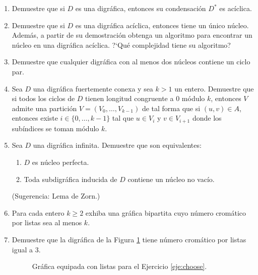 \documentclass{article}
\begin{document}
\begin{enumerate}
  \item Demuestre que si $D$ es una digr\'afica, entonces su
    condensaci\'on $D^\ast$ es ac\'iclica.

  \item Demuestre que si $D$ es una digr\'afica ac\'iclica, entonces
    tiene un \'unico n\'ucleo.   Adem\'as, a partir de su demostraci\'on
    obtenga un algoritmo para encontrar un n\'ucleo en una digr\'afica
    ac\'iclica.   ?`Qu\'e complejidad tiene su algoritmo?

  \item Demuestre que cualquier digr\'afica con al menos dos n\'ucleos
    contiene un ciclo par.

  \item Sea $D$ una digr\'afica fuertemente conexa y sea $k > 1$ un entero.
    Demuestre que si todos los ciclos de $D$ tienen longitud congruente a
    $0$ m\'odulo $k$, entonces $V$ admite una partici\'on $V = (V_0, \dots,
    V_{k-1})$ de tal forma que si $(u,v) \in A$, entonces existe $i \in
    \{ 0, \dots, k-1 \}$ tal que $u \in V_i$ y $v \in V_{i+1}$ donde los
    sub\'indices se toman m\'odulo $k$.

  \item Sea $D$ una digr\'afica infinita.  Demuestre que son equivalentes:
    \begin{enumerate}
      \item $D$ es n\'ucleo perfecta.

      \item Toda subdigr\'afica inducida de $D$ contiene un n\'ucleo no
        vac\'io.
    \end{enumerate}
    (Sugerencia: Lema de Zorn.)

  \item Para cada entero $k \ge 2$ exhiba una gr\'afica bipartita cuyo
    n\'umero crom\'atico por listas sea al menos $k$.

  \item Demuestre que la digr\'afica de la Figura \ref{fig:choose} tiene
    n\'umero crom\'atico por listas igual a $3$.
    \label{eje:choose}
    \begin{figure}[ht!]
    \centering
    \caption{Gr\'afica equipada con listas para el Ejercicio \ref{eje:choose}.}
    \label{fig:choose}
    \end{figure}
\end{enumerate}
\end{document}
